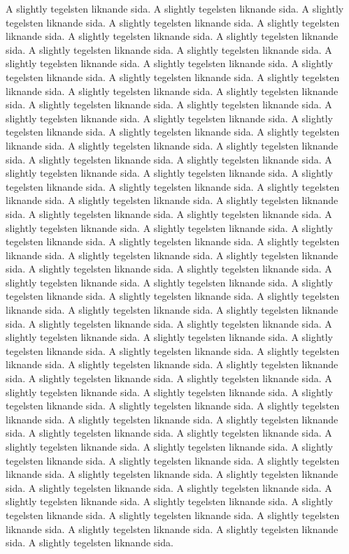 \documentclass[cropmarks, frame, english]{idamasterthesis}
\begin{document}
A slightly tegelsten liknande sida. 
A slightly tegelsten liknande sida. 
A slightly tegelsten liknande sida. 
A slightly tegelsten liknande sida. 
A slightly tegelsten liknande sida. 
A slightly tegelsten liknande sida. 
A slightly tegelsten liknande sida. 
A slightly tegelsten liknande sida. 
A slightly tegelsten liknande sida. 
A slightly tegelsten liknande sida. 
A slightly tegelsten liknande sida. 
A slightly tegelsten liknande sida. 
A slightly tegelsten liknande sida. 
A slightly tegelsten liknande sida. 
A slightly tegelsten liknande sida. 
A slightly tegelsten liknande sida. 
A slightly tegelsten liknande sida. 
A slightly tegelsten liknande sida. 
A slightly tegelsten liknande sida. 
A slightly tegelsten liknande sida. 
A slightly tegelsten liknande sida. 
A slightly tegelsten liknande sida. 
A slightly tegelsten liknande sida. 
A slightly tegelsten liknande sida. 
A slightly tegelsten liknande sida. 
A slightly tegelsten liknande sida. 
A slightly tegelsten liknande sida. 
A slightly tegelsten liknande sida. 
A slightly tegelsten liknande sida. 
A slightly tegelsten liknande sida. 
A slightly tegelsten liknande sida. 
A slightly tegelsten liknande sida. 
A slightly tegelsten liknande sida. 
A slightly tegelsten liknande sida. 
A slightly tegelsten liknande sida. 
A slightly tegelsten liknande sida. 
A slightly tegelsten liknande sida. 
A slightly tegelsten liknande sida. 
A slightly tegelsten liknande sida. 
A slightly tegelsten liknande sida. 
A slightly tegelsten liknande sida. 
A slightly tegelsten liknande sida. 
A slightly tegelsten liknande sida. 
A slightly tegelsten liknande sida. 
A slightly tegelsten liknande sida. 
A slightly tegelsten liknande sida. 
A slightly tegelsten liknande sida. 
A slightly tegelsten liknande sida. 
A slightly tegelsten liknande sida. 
A slightly tegelsten liknande sida. 
A slightly tegelsten liknande sida. 
A slightly tegelsten liknande sida. 
A slightly tegelsten liknande sida. 
A slightly tegelsten liknande sida. 
A slightly tegelsten liknande sida. 
A slightly tegelsten liknande sida. 
A slightly tegelsten liknande sida. 
A slightly tegelsten liknande sida. 
A slightly tegelsten liknande sida. 
A slightly tegelsten liknande sida. 
A slightly tegelsten liknande sida. 
A slightly tegelsten liknande sida. 
A slightly tegelsten liknande sida. 
A slightly tegelsten liknande sida. 
A slightly tegelsten liknande sida. 
A slightly tegelsten liknande sida. 
A slightly tegelsten liknande sida. 
A slightly tegelsten liknande sida. 
A slightly tegelsten liknande sida. 
A slightly tegelsten liknande sida. 
A slightly tegelsten liknande sida. 
A slightly tegelsten liknande sida. 
A slightly tegelsten liknande sida. 
A slightly tegelsten liknande sida. 
A slightly tegelsten liknande sida. 
A slightly tegelsten liknande sida. 
A slightly tegelsten liknande sida. 
A slightly tegelsten liknande sida. 
A slightly tegelsten liknande sida. 
A slightly tegelsten liknande sida. 
A slightly tegelsten liknande sida. 
A slightly tegelsten liknande sida. 
A slightly tegelsten liknande sida. 
A slightly tegelsten liknande sida. 
A slightly tegelsten liknande sida. 
A slightly tegelsten liknande sida. 
A slightly tegelsten liknande sida. 
A slightly tegelsten liknande sida. 
A slightly tegelsten liknande sida. 
\end{document}
